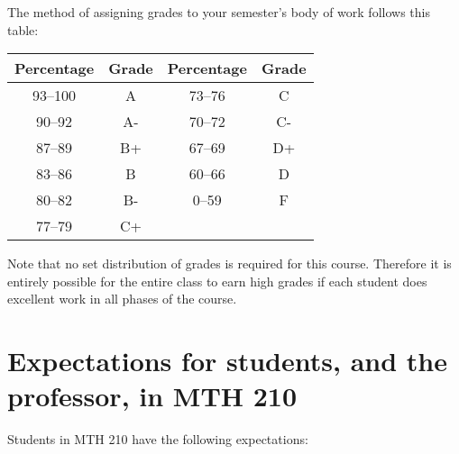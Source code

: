 \documentclass[11pt]{article}
\begin{document}
The method of assigning grades to your semester's body of work follows this table: 
\begin{center}
	\begin{tabular}{c|c||c|c}
	Percentage & Grade & Percentage & Grade \\ \hline
	93--100 & A & 73--76 & C \\
	90--92 & A- & 70--72 & C- \\
	87--89 & B+ & 67--69 & D+  \\
	83--86 & B & 60--66 & D\\
	80--82 & B- & 0--59 & F \\
	77--79 & C+ & 
	\end{tabular}
\end{center}
Note that no set distribution of grades is required for this course. Therefore it is entirely possible for the entire class to earn high grades if each student does excellent work in all phases of the course. 


\section*{Expectations for students, and the professor, in MTH 210}

Students in MTH 210 have the following expectations: 
\end{document}
